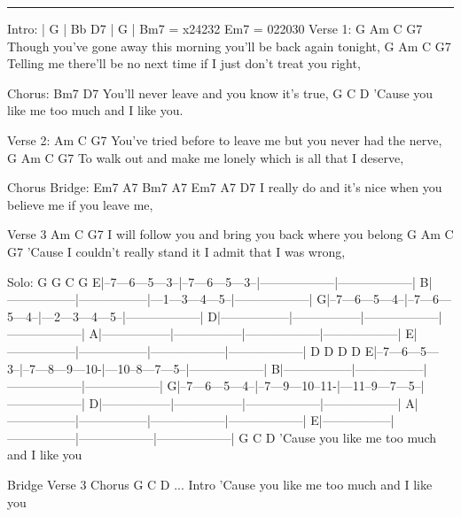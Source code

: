 \noindent\rule{\columnwidth}{1pt}

\begin{lstsong}
Intro: | G | Bb D7 | G |              Bm7 = x24232   Em7 = 022030
Verse 1:
G                   Am                         C            G7
Though you've gone away this morning you'll be back again tonight, 
G       Am                                C                    G7
Telling me there'll be no next time if I just don't treat you right, 

Chorus:
       Bm7                           D7
You'll never leave and you know it's true, 
           G           C               D
'Cause you like me too much and I like you. 

Verse 2:
       Am                               C             G7
You've tried before to leave me but you never had the nerve,
G       Am                              C           G7
To walk out and make me lonely which is all that I deserve,

Chorus
Bridge:
Em7      A7          Bm7              A7      Em7 A7       D7
I really do and it's nice when you believe me if you leave me,

Verse 3
Am                              C                G7
I will follow you and bring you back where you belong
G         Am                          C              G7
'Cause I couldn't really stand it I admit that I was wrong, 
\end{lstsong}
\begin{lsttab}
Solo:
  G		     G		      C			G
E|--7---6---5---3--|--7---6---5---3--|------------------|------------------|
B|-----------------|-----------------|---1---3---4---5--|------------------|
G|--7---6---5---4--|--7---6---5---4--|---2---3---4---5--|------------------|
D|-----------------|-----------------|------------------|------------------|
A|-----------------|-----------------|------------------|------------------|
E|-----------------|-----------------|------------------|------------------|
  D		     D		      D			D
E|--7---6---5---3--|--7---8---9---10-|---10--8---7---5--|------------------|
B|-----------------|-----------------|------------------|------------------|
G|--7---6---5---4--|--7---9---10--11-|---11--9---7---5--|------------------|
D|-----------------|-----------------|------------------|------------------|
A|-----------------|-----------------|------------------|------------------|
E|-----------------|-----------------|------------------|------------------|
          G            C             D 
'Cause you like me too much and I like you
\end{lsttab}
\begin{lstsong}
Bridge
Verse 3
Chorus
          G            C             D       ... Intro
'Cause you like me too much and I like you
\end{lstsong}
\newpage
